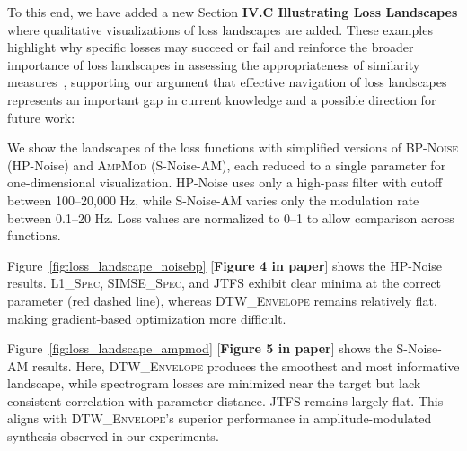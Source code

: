 \documentclass[11pt]{article}
\newcommand{\BPNoise}{\textsc{BP-Noise}}
\newcommand{\AmpMod}{\textsc{AmpMod}}
\newcommand{\DTWEnv}{\textsc{DTW\_Envelope}}
\newcommand{\SIMSESpec}{\textsc{SIMSE\_Spec}}
\newcommand{\LoneSpec}{\textsc{L1\_Spec}}
\newcommand{\JTFS}{\textsc{JTFS}}
\begin{document}
To this end, we have added a new Section \textbf{IV.C Illustrating Loss Landscapes} where qualitative visualizations of loss landscapes  are added. These examples highlight why specific losses may succeed or fail and reinforce the broader importance of loss landscapes in assessing the appropriateness of similarity measures~\cite{vahidi2023mesostructures,turian2020sorry}, supporting our argument that effective navigation of loss landscapes represents an important gap in current knowledge and a possible direction for future work:


\begin{displayquote}
We show the landscapes of the loss functions with simplified versions of \BPNoise{} (HP-Noise) and \AmpMod{} (S-Noise-AM), each reduced to a single parameter for one-dimensional visualization. HP-Noise uses only a high-pass filter with cutoff between 100–20,000 Hz, while S-Noise-AM varies only the modulation rate between 0.1–20 Hz. Loss values are normalized to 0–1 to allow comparison across functions.

    Figure~\ref{fig:loss_landscape_noisebp} [\textbf{Figure 4 in paper}] shows the HP-Noise results. \LoneSpec{}, \SIMSESpec{}, and \JTFS{} exhibit clear minima at the correct parameter (red dashed line), whereas \DTWEnv{} remains relatively flat, making gradient-based optimization more difficult.

    Figure~\ref{fig:loss_landscape_ampmod} [\textbf{Figure 5 in paper}]  shows the S-Noise-AM results. Here, \DTWEnv{} produces the smoothest and most informative landscape, while spectrogram losses are minimized near the target but lack consistent correlation with parameter distance. \JTFS{} remains largely flat. This aligns with \DTWEnv's superior performance in amplitude-modulated synthesis observed in our experiments.
\end{displayquote}
\end{document}
